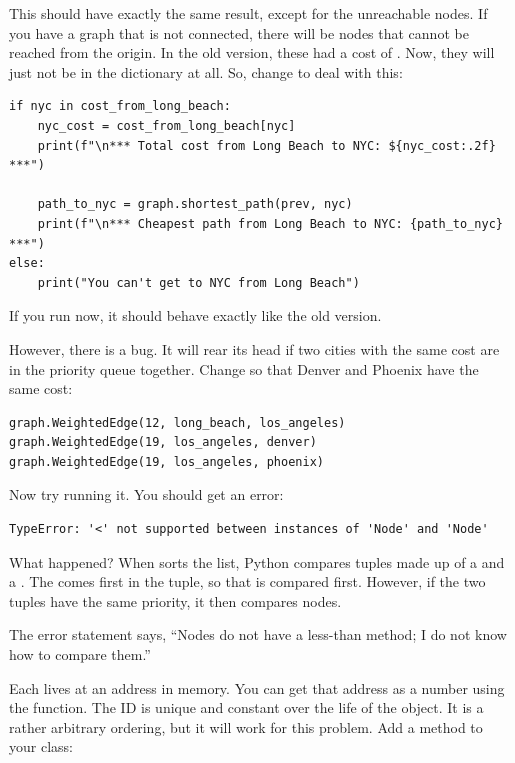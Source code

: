 This should have exactly the same result, except for the unreachable nodes.
If you have a graph that is not connected, there will be nodes that
cannot be reached from the origin.  In the old version, these had a
cost of .  Now, they will just not be in the dictionary at all.  So, change  to deal with this:

\begin{verbatim}
if nyc in cost_from_long_beach:
    nyc_cost = cost_from_long_beach[nyc]
    print(f"\n*** Total cost from Long Beach to NYC: ${nyc_cost:.2f} ***")

    path_to_nyc = graph.shortest_path(prev, nyc)
    print(f"\n*** Cheapest path from Long Beach to NYC: {path_to_nyc} ***")
else:
    print("You can't get to NYC from Long Beach")
\end{verbatim}

If you run  now, it should behave exactly like the old version.

However, there is a bug. It will rear its head if two cities with the same
cost are in the priority queue together.  Change 
so that Denver and Phoenix have the same cost:

\begin{verbatim}
graph.WeightedEdge(12, long_beach, los_angeles)
graph.WeightedEdge(19, los_angeles, denver)
graph.WeightedEdge(19, los_angeles, phoenix)
\end{verbatim}

Now try running it.  You should get an error:

\begin{verbatim}
TypeError: '<' not supported between instances of 'Node' and 'Node'
\end{verbatim}

What happened? When  sorts the list, Python compares
tuples made up of a  and a .  The
 comes first in the tuple, so that is compared
first. However, if the two tuples have the same priority, it then
compares nodes.

The error statement says, ``Nodes do not have a less-than method; I do not
know how to compare them.''

Each  lives at an address in memory. You can get that
address as a number using the  function. The ID is
unique and constant over the life of the object. It is a rather
arbitrary ordering, but it will work for this problem.  Add a method to
your  class:

